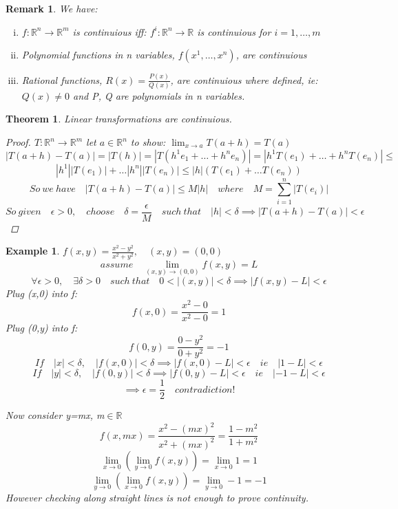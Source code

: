 \documentclass[12pt]{article}
\def\RR{\mathbb{R}}
\newtheorem{theorem}{Theorem}[section]
\newtheorem{example}{Example}[section]
\newtheorem*{remark}{Remark}
\begin{document}
\begin{remark} We have:\\
\begin{enumerate}[(i)]
\item $f:\RR^{n} \rightarrow \RR^{m}$ is continuious iff: $f^{i}:\RR^{n} \rightarrow \RR$ is continuious for $i=1,\dots , m$
\item Polynomial functions in n variables, $f(x^{1}, \dots ,x^{n})$, are continuious
\item Rational functions, $R(x)= \frac{P(x)}{Q(x)}$, are continuious where defined, ie: $Q(x) \neq 0$ and P, Q are polynomials in n variables.
\end{enumerate}
\end{remark}

\begin{theorem}\label{T:Lin trans cont}
Linear transformations are continuious.
\begin{proof}
$T:\RR^{n} \rightarrow \RR^{m}$ let $a \in \RR^{n}$ to show: $\lim_{x\to a}T(a+h) = T(a)$
\[|T(a+h) - T(a)|=|T(h)|=|T(h^{1}e_{1}+ \dots +h^{n}e_{n})|=|h^{1}T(e_{1}) + \dots +h^{n}T(e_{n})| \leq \] \[|h^{1}||T(e_{1})|+ \dots |h^{n}||T(e_{n})| \leq |h|(T(e_{1})+ \dots T(e_{n}))\]
\[So \: we\:  have \quad |T(a+h) - T(a)| \leq M|h| \quad where \quad M= \sum_{i=1}^{n}|T(e_i)|\]
\[So \: given \quad \epsilon > 0,\quad choose \quad \delta= \frac{\epsilon}{M} \quad such \: that \quad |h|< \delta \implies |T(a+h) - T(a)|< \epsilon\]
\end{proof}
\end{theorem}

\begin{example}
$f(x,y)= \frac{x^{2} - y^{2}}{x^{2} +y^{2}}, \quad (x,y)=(0,0)$
\[assume \quad \lim_{(x,y) \to (0,0)} f(x,y) = L\]
\[\forall \epsilon > 0, \quad \exists \delta>0 \quad such \: that \quad 0<|(x,y)|<\delta \implies |f(x,y)-L|<\epsilon\] 
Plug (x,0) into f: \[ f(x,0)= \frac{x^{2}-0}{x^{2}-0} = 1\]
Plug (0,y) into f: \[f(0,y)= \frac{0-y^{2}}{0 +y^{2}} = -1\]
\[If \quad |x|< \delta, \quad |f(x,0)| < \delta \implies |f(x,0) - L|< \epsilon \quad ie \quad |1-L|< \epsilon\]
\[If \quad |y|< \delta, \quad |f(0,y)| < \delta \implies |f(0,y) - L|< \epsilon \quad ie \quad |-1-L|< \epsilon\]
\[\implies \epsilon = \frac{1}{2} \quad contradiction! \]

Now consider y=mx, m$\in \RR$
\[f(x,mx)=\frac{x^{2} - (mx)^{2}}{x^{2} + (mx)^{2}} = \frac{1-m^{2}}{1+m^{2}}\]
\[\lim_{x \to 0}(\lim_{y \to 0} f(x,y)) = \lim_{x \to 0}1 = 1\]
\[\lim_{y \to 0}(\lim_{x \to 0} f(x,y)) = \lim_{y \to 0}-1 = -1\]
However checking along straight lines is not enough to prove continuity.
\end{example}
\end{document}
